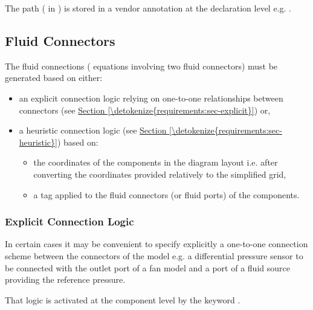 \documentclass[letterpaper,10pt, openany,english]{sphinxmanual}
\begin{document}
The path ( in {\hyperref[\detokenize{requirements:configuration-api}]{}}) is stored in a vendor annotation at the declaration level e.g. .


\subsection{Fluid Connectors}
\label{\detokenize{requirements:fluid-connectors}}\label{\detokenize{requirements:sec-fluid-connectors}}
The fluid connections ( equations involving two fluid connectors) must be generated based on either:
\begin{itemize}
\item {} 
an explicit connection logic relying on one-to-one relationships between connectors (see \hyperref[\detokenize{requirements:sec-explicit}]{Section \ref{\detokenize{requirements:sec-explicit}}}) or,

\item {} 
a heuristic connection logic (see \hyperref[\detokenize{requirements:sec-heuristic}]{Section \ref{\detokenize{requirements:sec-heuristic}}}) based on:
\begin{itemize}
\item {} 
the coordinates of the components in the diagram layout i.e. after converting the coordinates provided relatively to the simplified grid,

\item {} 
a tag applied to the fluid connectors (or fluid ports) of the components.

\end{itemize}

\end{itemize}


\subsubsection{Explicit Connection Logic}
\label{\detokenize{requirements:explicit-connection-logic}}\label{\detokenize{requirements:sec-explicit}}
In certain cases it may be convenient to specify explicitly a one-to-one connection scheme between the connectors of the model e.g. a differential pressure sensor to be connected with the outlet port of a fan model and a port of a fluid source providing the reference pressure.

That logic is activated at the component level by the keyword .
\end{document}
